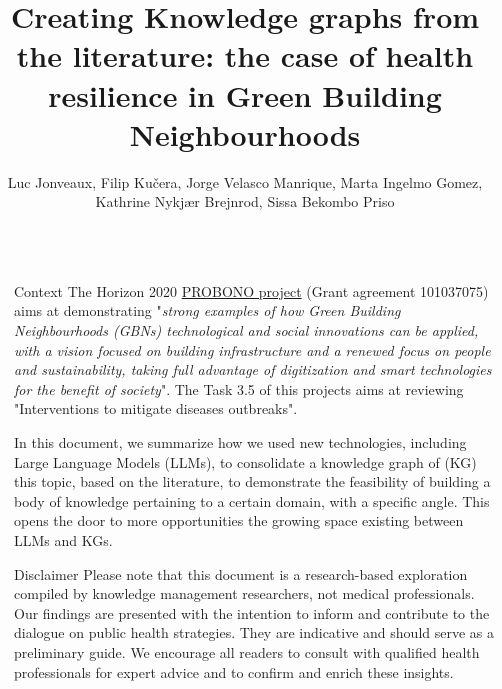 \documentclass[final]{beamer}
\title{Creating Knowledge graphs from the literature: the case of health resilience in Green Building Neighbourhoods} %
\author{Luc Jonveaux, Filip Kučera, Jorge Velasco Manrique, Marta Ingelmo Gomez, Kathrine Nykjær Brejnrod,  Sissa Bekombo Priso} %
\institute{The Integrator-centric approach for realising innovative energy efficient buildings in connected sustainable green neighbourhoods project} %
\newlength{\sepmargin}
\newlength{\onecolwid}
\begin{document}
\textblockorigin{10mm}{10mm} %
  \setlength{\belowcaptionskip}{2ex} %
  \setlength\belowdisplayshortskip{1ex} %
  
  


      \begin{columns}[t] %
	  
      \begin{column}{\sepmargin}\end{column}
      
	    \begin{column}{\onecolwid} %


		  \begin{block}{Context}
The Horizon 2020 \href{https://doi.org/10.3030/101037075}{PROBONO project} (Grant agreement  101037075) aims at demonstrating "\textit{strong examples of how Green Building Neighbourhoods (GBNs) technological and social innovations can be applied, with a vision focused on building infrastructure and a renewed focus on people and sustainability, taking full advantage of digitization and smart technologies for the benefit of society}". The Task 3.5 of this projects  aims at reviewing "Interventions to mitigate diseases outbreaks".

In this document, we summarize how we used new technologies, including Large Language Models (LLMs), to consolidate a knowledge graph of (KG) this topic, based on the literature, to demonstrate the feasibility of building a body of knowledge pertaining to a certain domain, with a specific angle. This opens the door to more opportunities the growing space existing between LLMs and KGs.
\end{block}

\begin{block}{Disclaimer}
Please note that this document is a research-based exploration compiled by knowledge management researchers, not medical professionals. Our findings are presented with the intention to inform and contribute to the dialogue on public health strategies. They are indicative and should serve as a preliminary guide. We encourage all readers to consult with qualified health professionals for expert advice and to confirm and enrich these insights.


\end{block}
\end{column}
\end{columns}
\end{document}
